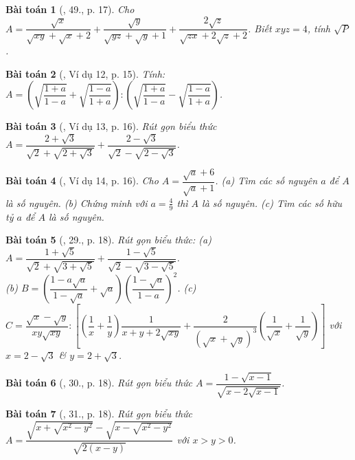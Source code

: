 \documentclass{article}
\newtheorem{baitoan}{Bài toán}
\begin{document}
\begin{baitoan}[\cite{Tuyen_Toan_9}, 49., p. 17]
	Cho $A = \dfrac{\sqrt{x}}{\sqrt{xy} + \sqrt{x} + 2} + \dfrac{\sqrt{y}}{\sqrt{yz} + \sqrt{y} + 1} + \dfrac{2\sqrt{z}}{\sqrt{zx} + 2\sqrt{z} + 2}$. Biết $xyz = 4$, tính $\sqrt{P}$.
\end{baitoan}

\begin{baitoan}[\cite{Binh_Toan_9_tap_1}, Ví dụ 12, p. 15]
	Tính: $A = \left(\sqrt{\dfrac{1 + a}{1 - a}} + \sqrt{\dfrac{1 - a}{1 + a}}\right):\left(\sqrt{\dfrac{1 + a}{1 - a}} - \sqrt{\dfrac{1 - a}{1 + a}}\right)$.
\end{baitoan}

\begin{baitoan}[\cite{Binh_Toan_9_tap_1}, Ví dụ 13, p. 16]
	Rút gọn biểu thức $A = \dfrac{2 + \sqrt{3}}{\sqrt{2} + \sqrt{2 + \sqrt{3}}} + \dfrac{2 - \sqrt{3}}{\sqrt{2} - \sqrt{2 - \sqrt{3}}}$.
\end{baitoan}

\begin{baitoan}[\cite{Binh_Toan_9_tap_1}, Ví dụ 14, p. 16]
	Cho $A = \dfrac{\sqrt{a} + 6}{\sqrt{a} + 1}$. (a) Tìm các số nguyên $a$ để $A$ là số nguyên. (b) Chứng minh với $a = \frac{4}{9}$ thì $A$ là số nguyên. (c) Tìm các số hữu tỷ $a$ để $A$ là số nguyên.
\end{baitoan}

\begin{baitoan}[\cite{Binh_Toan_9_tap_1}, 29., p. 18]
	Rút gọn biểu thức: (a) $A = \dfrac{1 + \sqrt{5}}{\sqrt{2} + \sqrt{3 + \sqrt{5}}} + \dfrac{1 - \sqrt{5}}{\sqrt{2} - \sqrt{3 - \sqrt{5}}}$.\\(b) $B = \left(\dfrac{1 - a\sqrt{a}}{1 - \sqrt{a}} + \sqrt{a}\right)\left(\dfrac{1 - \sqrt{a}}{1 - a}\right)^2$. (c) $C = \dfrac{\sqrt{x} - \sqrt{y}}{xy\sqrt{xy}}:\left[\left(\dfrac{1}{x} + \dfrac{1}{y}\right)\dfrac{1}{x + y+ 2\sqrt{xy}} + \dfrac{2}{(\sqrt{x} + \sqrt{y})^3}\left(\dfrac{1}{\sqrt{x}} + \dfrac{1}{\sqrt{y}}\right)\right]$ với $x = 2 - \sqrt{3}$ \& $y = 2 + \sqrt{3}$.
\end{baitoan}

\begin{baitoan}[\cite{Binh_Toan_9_tap_1}, 30., p. 18]
	Rút gọn biểu thức $A = \dfrac{1 - \sqrt{x - 1}}{\sqrt{x - 2\sqrt{x - 1}}}$.
\end{baitoan}

\begin{baitoan}[\cite{Binh_Toan_9_tap_1}, 31., p. 18]
	Rút gọn biểu thức $A = \dfrac{\sqrt{x + \sqrt{x^2 - y^2}} - \sqrt{x - \sqrt{x^2 - y^2}}}{\sqrt{2(x - y)}}$ với $x > y > 0$.
\end{baitoan}
\end{document}

